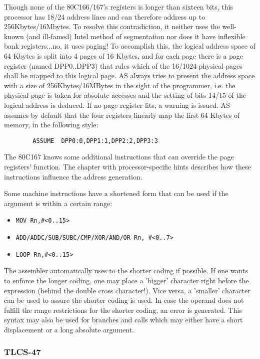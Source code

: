 \documentclass[12pt,twoside]{report}
\begin{document}
Though none of the 80C166/167's registers is longer than sixteen bits,
this processor has 18/24 address lines and can therefore address up
to 256Kbytes/16Mbytes.  To resolve this contradiction, it neither
uses the well-known (and ill-famed) Intel method of segmentation nor
does it have inflexible bank registers...no, it uses paging!  To accomplish
this, the logical address space of 64 Kbytes is split into 4 pages of
16 Kbytes, and for each page there is a page register (named
DPP0..DPP3) that rules which of the 16/1024 physical pages shall be
mapped to this logical page.  AS always tries to present the address
space with a size of 256Kbytes/16MBytes in the sight of the
programmer, i.e. the physical page is taken for absolute accesses and
the setting of bits 14/15 of the logical address is deduced.  If no
page register fits, a warning is issued.  AS assumes by default that
the four registers linearly map the first 64 Kbytes of memory, in the
following style:
\begin{verbatim}
        ASSUME  DPP0:0,DPP1:1,DPP2:2,DPP3:3
\end{verbatim}
The 80C167 knows some additional instructions that can override the
page registers' function.  The chapter with processor-specific hints
describes how these instructions influence the address generation.
\par
Some machine instructions have a shortened form that can be used if
the argument is within a certain range:
\begin{itemize}
\item{\verb!MOV Rn,#<0..15>!}
\item{\verb!ADD/ADDC/SUB/SUBC/CMP/XOR/AND/OR Rn, #<0..7>!}
\item{\verb!LOOP Rn,#<0..15>!}
\end{itemize}
The assembler automatically uses to the shorter coding if possible.
If one wants to enforce the longer coding, one may place a 'bigger'
character right before the expression (behind the double cross character!).
Vice versa, a 'smaller' character can be used to assure the shorter
coding is used.  In case the operand does not fulfill the range
restrictions for the shorter coding, an error is generated.  This syntax
may also be used for branches and calls which may either have a short
displacement or a long absolute argument.


\subsubsection{TLCS-47}
\end{document}
